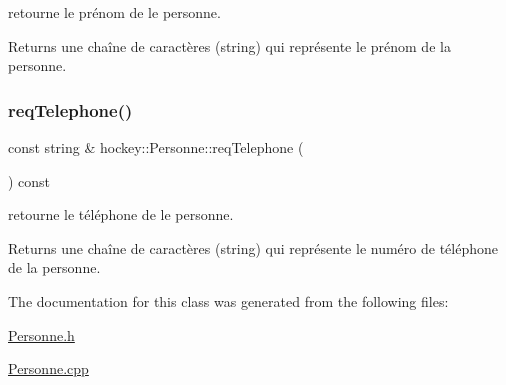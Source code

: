 retourne le prénom de le personne. 

\begin{DoxyReturn}{Returns}
une chaîne de caractères (string) qui représente le prénom de la personne. 
\end{DoxyReturn}
\mbox{\label{classhockey_1_1Personne_ad6b6a4dc6bb847c2bec38acb9104e378}} 
\subsubsection{\texorpdfstring{req\+Telephone()}{reqTelephone()}}
{\footnotesize\ttfamily const string \& hockey\+::\+Personne\+::req\+Telephone (\begin{DoxyParamCaption}{ }\end{DoxyParamCaption}) const}



retourne le téléphone de le personne. 

\begin{DoxyReturn}{Returns}
une chaîne de caractères (string) qui représente le numéro de téléphone de la personne. 
\end{DoxyReturn}


The documentation for this class was generated from the following files\+:\begin{DoxyCompactItemize}
\item 
\hyperlink{Personne_8h}{Personne.\+h}\item 
\hyperlink{Personne_8cpp}{Personne.\+cpp}\end{DoxyCompactItemize}
